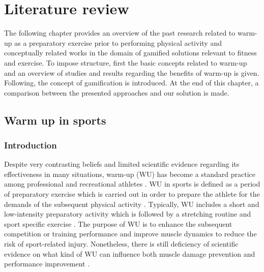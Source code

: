 \chapter{Literature review}\label{chapter:warmup}
The following chapter provides an overview of the past research related to warm-up as a preparatory exercise prior to performing physical activity and conceptually related works in the domain of gamified solutions relevant to fitness and exercise. To impose structure, first the basic concepts related to warm-up and an overview of studies and results regarding the benefits of warm-up is given. Following, the concept of gamification is introduced. At the end of this chapter, a comparison between the presented approaches and our solution is made.
\section{Warm up in sports}
\subsection{Introduction}
Despite very contrasting beliefs and limited scientific evidence regarding its effectiveness in many situations, warm-up (WU) has become a standard practice among professional and
recreational athletes \cite{bishop2003warm1, bishop2003warm2, shellock1985warming}. WU in sports is defined as a period of preparatory exercise which is carried out in order to prepare the athlete for the demands of the subsequent physical activity  \cite{karvonen1992importance, woods2007warm, hedrick1992exercise}.
Typically, WU includes a short and low-intensity preparatory activity which is followed by a stretching routine and sport specific exercise \cite{safran1989warm}. 
The purpose of WU is to enhance the subsequent competition or training performance and improve muscle dynamics to reduce the risk of sport-related injury\cite{bishop2003warm1, shellock1985warming, knudson2008warm}. 
Nonetheless, there is still deficiency of scientific evidence on what kind of WU can influence both muscle damage prevention and performance improvement \cite{safran1989warm}.\\ %
